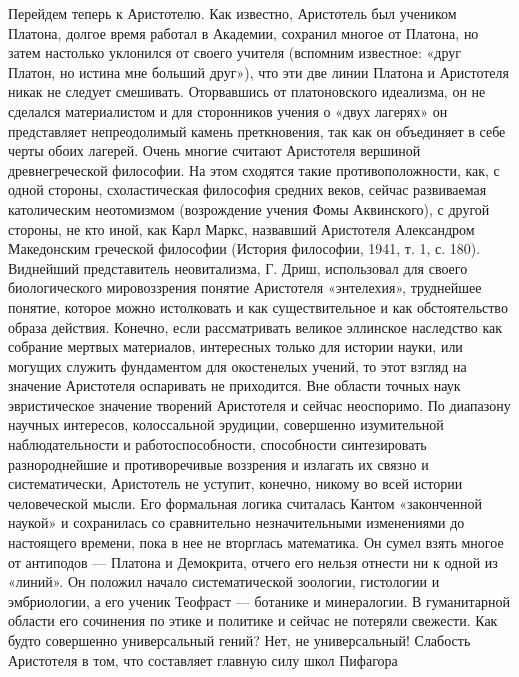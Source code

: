 Перейдем теперь  к Аристотелю.  Как известно, Аристотель  был учеником
Платона,  долгое   время  работал  в  Академии,   сохранил  многое  от
Платона,  но затем  настолько  уклонился от  своего учителя  (вспомним
известное: «друг  Платон, но  истина мне больший  друг»), что  эти две
линии  Платона и  Аристотеля никак  не следует  смешивать. Оторвавшись
от  платоновского  идеализма,  он  не  сделался  материалистом  и  для
сторонников  учения о  «двух  лагерях»  он представляет  непреодолимый
камень  преткновения,  так  как  он  объединяет  в  себе  черты  обоих
лагерей.  Очень  многие  считают Аристотеля  вершиной  древнегреческой
философии.  На этом  сходятся  такие противоположности,  как, с  одной
стороны,  схоластическая философия  средних веков,  сейчас развиваемая
католическим  неотомизмом  (возрождение  учения  Фомы  Аквинского),  с
другой  стороны, не  кто иной,  как Карл  Маркс, назвавший  Аристотеля
Александром Македонским греческой  философии (История философии, 1941,
т.  1,  с.  180).   Виднейший  представитель  неовитализма,  Г.  Дриш,
использовал для своего биологического мировоззрения понятие Аристотеля
«энтелехия»,  труднейшее  понятие,  которое можно  истолковать  и  как
существительное и  как обстоятельство  образа действия.  Конечно, если
рассматривать  великое  эллинское   наследство  как  собрание  мертвых
материалов, интересных  только для истории науки,  или могущих служить
фундаментом  для  окостенелых  учений,  то  этот  взгляд  на  значение
Аристотеля  оспаривать   не  приходится.   Вне  области   точных  наук
эвристическое  значение  творений   Аристотеля  и  сейчас  неоспоримо.
По  диапазону  научных  интересов, колоссальной  эрудиции,  совершенно
изумительной   наблюдательности   и   работоспособности,   способности
синтезировать  разнороднейшие и  противоречивые  воззрения и  излагать
их   связно  и   систематически,  Аристотель   не  уступит,   конечно,
никому  во  всей истории  человеческой  мысли.  Его формальная  логика
считалась Кантом  «законченной наукой»  и сохранилась  со сравнительно
незначительными  изменениями  до настоящего  времени,  пока  в нее  не
вторглась математика. Он сумел взять многое от антиподов --- Платона и
Демокрита, отчего его нельзя отнести ни к одной из «линий». Он положил
начало  систематической  зоологии,  гистологии и  эмбриологии,  а  его
ученик  Теофраст ---  ботанике и  минералогии. В  гуманитарной области
его  сочинения по  этике и  политике  и сейчас  не потеряли  свежести.
Как  будто  совершенно  универсальный гений?  Нет,  не  универсальный!
Слабость Аристотеля в  том, что составляет главную  силу школ Пифагора
